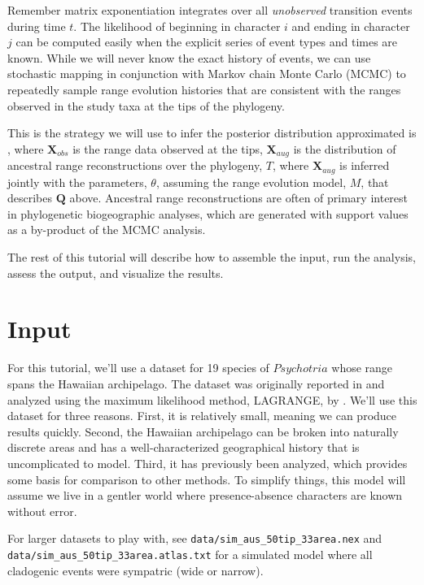 \documentclass[11pt]{article}
\begin{document}
Remember matrix exponentiation integrates over all \textit{unobserved} transition events during time $t$.
The likelihood of beginning in character $i$ and ending in character $j$ can be computed easily when the explicit series of event types and times are known.
While we will never know the exact history of events, we can use stochastic mapping in conjunction with Markov chain Monte Carlo (MCMC) to repeatedly sample range evolution histories that are consistent with the ranges observed in the study taxa at the tips of the phylogeny.

This is the strategy we will use to infer the posterior distribution approximated is 
, where $\textbf{X}_{obs}$ is the range data observed at the tips, $\textbf{X}_{aug}$ is the distribution of ancestral range reconstructions over the phylogeny, $T$, where $\textbf{X}_{aug}$ is inferred jointly with the parameters, $\theta$, assuming the range evolution model, $M$, that describes $\textbf{Q}$ above.
Ancestral range reconstructions are often of primary interest in phylogenetic biogeographic analyses, which are generated with support values as a by-product of the MCMC analysis.

The rest of this tutorial will describe how to assemble the input, run the analysis, assess the output, and visualize the results.

\newpage

\section{Input}

For this tutorial, we'll use a dataset for 19 species of $Psychotria$ whose range spans the Hawaiian archipelago.
The dataset was originally reported in \citet{nepokroeff03} and analyzed using the maximum likelihood method, LAGRANGE, by \citet{ree08}.
We'll use this dataset for three reasons.
First, it is relatively small, meaning we can produce results quickly.
Second, the Hawaiian archipelago can be broken into naturally discrete areas and has a well-characterized geographical history that is uncomplicated to model.
Third, it has previously been analyzed, which provides some basis for comparison to other methods.
To simplify things, this model will assume we live in a gentler world where presence-absence characters are known without error.

For larger datasets to play with, see {\tt data/sim\_aus\_50tip\_33area.nex} and {\tt data/sim\_aus\_50tip\_33area.atlas.txt} for a simulated model where all cladogenic events were sympatric (wide or narrow). 
\end{document}
